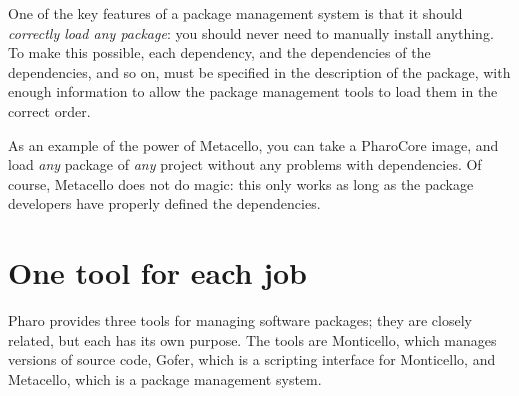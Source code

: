 \documentclass[a4paper,10pt,twoside]{book}
\begin{document}
One of the key features of a package management system is that it should \emph{correctly load any package}: you should never need to manually install anything.  To make this possible, each dependency, and the dependencies of the dependencies, and so on, must be specified in the description of the package, with enough information to allow the package management tools to load them in the correct order.

As an example of the power of Metacello, you can take a PharoCore image, and load {\em any} package of {\em any} project without any problems with dependencies. Of course, Metacello does not do magic: this only works as long as the package developers have properly defined the dependencies.


\section{One tool for each job}

Pharo provides three tools for managing software packages; they are closely related, but each has its own purpose. The tools are Monticello, which manages versions of source code, Gofer, which is a scripting interface for Monticello, and Metacello, which is a package management system.


\end{document}

